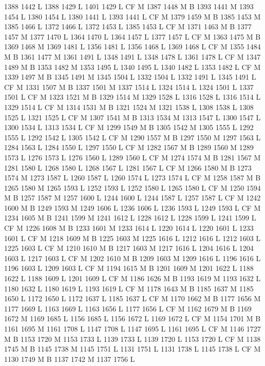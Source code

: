 {{{{{{{{{{{{{{{{{{{{{{{{1388 1442 L
1388 1429 L
1401 1429 L
CF M
1387 1448 M B
1393 1441 M 1393 1454 L
1380 1454 L
1380 1441 L
1393 1441 L
CF M
1379 1459 M B
1385 1453 M 1385 1466 L
1372 1466 L
1372 1453 L
1385 1453 L
CF M
1371 1463 M B
1377 1457 M 1377 1470 L
1364 1470 L
1364 1457 L
1377 1457 L
CF M
1363 1475 M B
1369 1468 M 1369 1481 L
1356 1481 L
1356 1468 L
1369 1468 L
CF M
1355 1484 M B
1361 1477 M 1361 1491 L
1348 1491 L
1348 1478 L
1361 1478 L
CF M
1347 1489 M B
1353 1482 M 1353 1495 L
1340 1495 L
1340 1482 L
1353 1482 L
CF M
1339 1497 M B
1345 1491 M 1345 1504 L
1332 1504 L
1332 1491 L
1345 1491 L
CF M
1331 1507 M B
1337 1501 M 1337 1514 L
1324 1514 L
1324 1501 L
1337 1501 L
CF M
1323 1521 M B
1329 1514 M 1329 1528 L
1316 1528 L
1316 1514 L
1329 1514 L
CF M
1314 1531 M B
1321 1524 M 1321 1538 L
1308 1538 L
1308 1525 L
1321 1525 L
CF M
1307 1541 M B
1313 1534 M 1313 1547 L
1300 1547 L
1300 1534 L
1313 1534 L
CF M
1299 1549 M B
1305 1542 M 1305 1555 L
1292 1555 L
1292 1542 L
1305 1542 L
CF M
1290 1557 M B
1297 1550 M 1297 1563 L
1284 1563 L
1284 1550 L
1297 1550 L
CF M
1282 1567 M B
1289 1560 M 1289 1573 L
1276 1573 L
1276 1560 L
1289 1560 L
CF M
1274 1574 M B
1281 1567 M 1281 1580 L
1268 1580 L
1268 1567 L
1281 1567 L
CF M
1266 1580 M B
1273 1574 M 1273 1587 L
1260 1587 L
1260 1574 L
1273 1574 L
CF M
1258 1587 M B
1265 1580 M 1265 1593 L
1252 1593 L
1252 1580 L
1265 1580 L
CF M
1250 1594 M B
1257 1587 M 1257 1600 L
1244 1600 L
1244 1587 L
1257 1587 L
CF M
1242 1600 M B
1249 1593 M 1249 1606 L
1236 1606 L
1236 1593 L
1249 1593 L
CF M
1234 1605 M B
1241 1599 M 1241 1612 L
1228 1612 L
1228 1599 L
1241 1599 L
CF M
1226 1608 M B
1233 1601 M 1233 1614 L
1220 1614 L
1220 1601 L
1233 1601 L
CF M
1218 1609 M B
1225 1603 M 1225 1616 L
1212 1616 L
1212 1603 L
1225 1603 L
CF M
1210 1610 M B
1217 1603 M 1217 1616 L
1204 1616 L
1204 1603 L
1217 1603 L
CF M
1202 1610 M B
1209 1603 M 1209 1616 L
1196 1616 L
1196 1603 L
1209 1603 L
CF M
1194 1615 M B
1201 1609 M 1201 1622 L
1188 1622 L
1188 1609 L
1201 1609 L
CF M
1186 1626 M B
1193 1619 M 1193 1632 L
1180 1632 L
1180 1619 L
1193 1619 L
CF M
1178 1643 M B
1185 1637 M 1185 1650 L
1172 1650 L
1172 1637 L
1185 1637 L
CF M
1170 1662 M B
1177 1656 M 1177 1669 L
1163 1669 L
1163 1656 L
1177 1656 L
CF M
1162 1679 M B
1169 1672 M 1169 1685 L
1156 1685 L
1156 1672 L
1169 1672 L
CF M
1154 1701 M B
1161 1695 M 1161 1708 L
1147 1708 L
1147 1695 L
1161 1695 L
CF M
1146 1727 M B
1153 1720 M 1153 1733 L
1139 1733 L
1139 1720 L
1153 1720 L
CF M
1138 1745 M B
1145 1738 M 1145 1751 L
1131 1751 L
1131 1738 L
1145 1738 L
CF M
1130 1749 M B
1137 1742 M 1137 1756 L
}}}}}}}}}}}}}}}}}}}}}}}}

